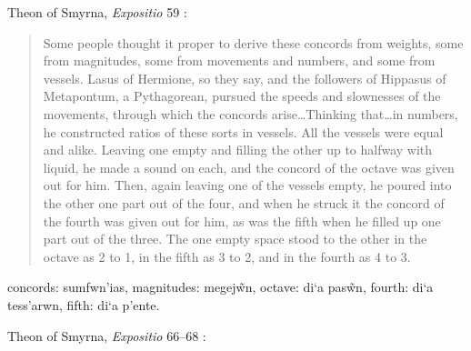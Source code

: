 \documentclass{article}
\newcommand{\textgreek}[1]{\begingroup\fontencoding{LGR}\selectfont#1\endgroup}
\theoremstyle{definition}
\begin{document}
Theon of Smyrna, {\em Expositio} 59 \cite[p.~218]{barker}:

\begin{quote}
Some people thought it proper to derive these concords from weights, some
from magnitudes, some from movements and numbers, and some from vessels.
Lasus of Hermione, so they say, and the followers of Hippasus of Metapontum,
a Pythagorean, pursued the speeds and slownesses of the movements, through
which the concords arise\dots Thinking that\dots in numbers, he constructed ratios
of these sorts in vessels. All the vessels were equal and alike. Leaving one
empty and filling the other up to halfway with liquid, he made a sound on each,
and the concord of the octave was given out for him. Then, again leaving one
of the vessels empty, he poured into the other one part out of the four, and
when he struck it the concord of the fourth was given out for him, as was the
fifth when he filled up one part out of the three. The one empty space stood
to the other in the octave as 2 to 1, in the fifth as 3 to 2, and in the fourth as
4 to 3.
\end{quote}

concords: \textgreek{sumfwn'ias},
magnitudes: \textgreek{megej\~wn},
octave: \textgreek{di`a pas\~wn},
fourth: \textgreek{di`a tess'arwn},
fifth: \textgreek{di`a p'ente}.  

Theon of Smyrna, {\em Expositio} 66--68 \cite[pp.~221--222]{barker}:
\end{document}
